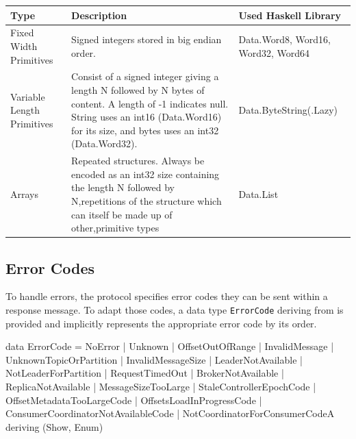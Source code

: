\begin{table}[H]
    \begin{tabular}{| p{3cm}| p{7cm} | p{5cm} |}
\hline
\textbf{Type} & \textbf{Description} & \textbf{Used Haskell Library} \\ \hline
Fixed Width Primitives     & Signed integers stored in big endian order.
& Data.Word8, Word16, Word32, Word64 \\ \hline
Variable Length Primitives & Consist of a signed integer giving a length N
followed by N bytes of content. A length of -1 indicates null. String uses an
int16 (Data.Word16) for its size, and bytes uses an int32 (Data.Word32).    &
Data.ByteString(.Lazy) \\ \hline
Arrays                     & Repeated structures. Always be encoded as an int32
size containing the length N followed by N,repetitions of the structure which
can itself be made up of other,primitive types & Data.List                          \\ \hline
\end{tabular}
\end{table}

\subsection{Error Codes}
\label{subsec:protocol-types-error-codes}

To handle errors, the protocol specifies error codes they can be sent within a
response message. To adapt those codes, a data type \lstinline{ErrorCode}
deriving from
 is provided and implicitly represents the
appropriate error code by its order.

\begin{code}
data ErrorCode =
        NoError
      | Unknown
      | OffsetOutOfRange
      | InvalidMessage
      | UnknownTopicOrPartition
      | InvalidMessageSize
      | LeaderNotAvailable
      | NotLeaderForPartition
      | RequestTimedOut
      | BrokerNotAvailable
      | ReplicaNotAvailable
      | MessageSizeTooLarge
      | StaleControllerEpochCode
      | OffsetMetadataTooLargeCode
      | OffsetsLoadInProgressCode
      | ConsumerCoordinatorNotAvailableCode
      | NotCoordinatorForConsumerCodeA
        deriving (Show, Enum)
\end{code}

